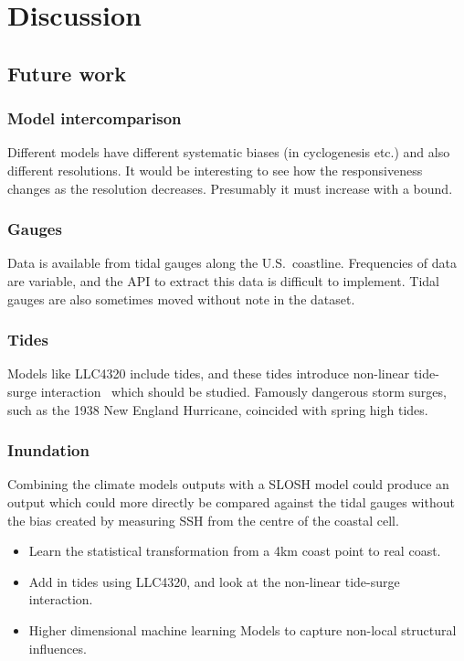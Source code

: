 \section{Discussion}
\label{sec:7_Discussion}

\subsection{Future work}
\label{sec:future}
\subsubsection{Model intercomparison}
Different models have different systematic biases (in cyclogenesis etc.)
and also different resolutions. It would be interesting to see how
the responsiveness changes as the resolution decreases.
Presumably it must increase with a bound.

\subsubsection{Gauges}
Data is available from tidal gauges along the U.S.~coastline.
Frequencies of data are variable, and the API to extract this data
is difficult to implement. Tidal gauges are also sometimes moved
without note in the dataset.

\subsubsection{Tides}
Models like LLC4320 include tides, and these tides introduce
non-linear tide-surge interaction~\cite{feng2019characteristics} which should be studied.
Famously dangerous storm surges, such as the 1938 New England
Hurricane, coincided with spring high tides.

\subsubsection{Inundation}
Combining the climate models outputs with a SLOSH model could produce
an output which could more directly be compared against the tidal gauges
without the bias created by measuring SSH from the centre of the coastal
cell.


\begin{itemize}
\item Learn the statistical transformation from
      a 4km coast point to real coast.
\item Add in tides using LLC4320, and look at the
      non-linear tide-surge interaction.
\item Higher dimensional machine learning Models
      to capture non-local structural influences.
\end{itemize}

